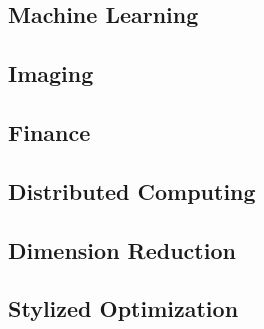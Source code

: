 \documentclass[amsa]{ipart}
\begin{document}
\newpage

%





%






%



\subsection{Machine Learning}\label{sec:ML}






\subsection{Imaging}\label{sec:Imaging}





\subsection{Finance}



\subsection{Distributed Computing}



\subsection{Dimension Reduction}



\subsection{Stylized Optimization}










\appendix

\end{document}
